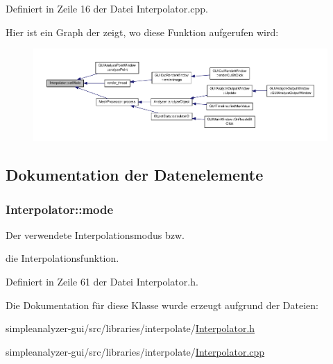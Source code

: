 Definiert in Zeile 16 der Datei Interpolator.\-cpp.



Hier ist ein Graph der zeigt, wo diese Funktion aufgerufen wird\-:
\nopagebreak
\begin{figure}[H]
\begin{center}
\leavevmode
\includegraphics[width=350pt]{classInterpolator_a2f9927fc580de7d2f94d85e6ca3ee3e3_icgraph}
\end{center}
\end{figure}




\subsection{Dokumentation der Datenelemente}
\hypertarget{classInterpolator_ace34e7696bdf4a1f0544b145efee898e}{
\subsubsection[{mode}]{ Interpolator\-::mode\hspace{0.3cm}{\ttfamily [private]}}}\label{classInterpolator_ace34e7696bdf4a1f0544b145efee898e}


Der verwendete Interpolationsmodus bzw. 

die Interpolationsfunktion. 

Definiert in Zeile 61 der Datei Interpolator.\-h.



Die Dokumentation für diese Klasse wurde erzeugt aufgrund der Dateien\-:\begin{DoxyCompactItemize}
\item 
simpleanalyzer-\/gui/src/libraries/interpolate/\hyperlink{Interpolator_8h}{Interpolator.\-h}\item 
simpleanalyzer-\/gui/src/libraries/interpolate/\hyperlink{Interpolator_8cpp}{Interpolator.\-cpp}\end{DoxyCompactItemize}

